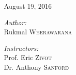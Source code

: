 \begin{titlepage}
\begin{center}
{\large August 19, 2016} %



\vspace{\fill}


\begin{minipage}{0.4\textwidth}
\begin{flushleft} \large
\emph{Author:}\\
\Large
Rukmal \textsc{Weerawarana}
\end{flushleft}
\end{minipage}
\hfill
\begin{minipage}{0.4\textwidth}
\begin{flushright} \large
\emph{Instructors:} \\
\Large
Prof. Eric \textsc{Zivot} \\
Dr. Anthony \textsc{Sanford}
\end{flushright}
\end{minipage}

\end{center}
\thispagestyle{empty}
\end{titlepage}
